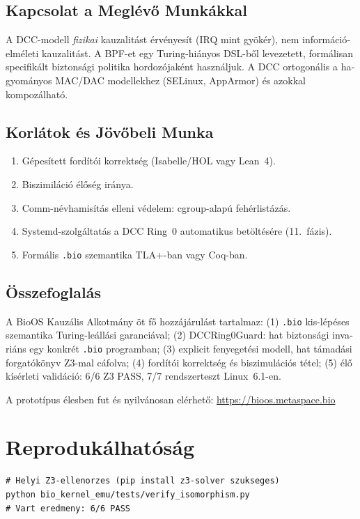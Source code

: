 \documentclass[11pt,a4paper,twoside]{article}
\newcommand{\bioURL}{\url{https://bioos.metaspace.bio}}
\begin{document}
\begin{magyar}
\subsection{Kapcsolat a Meglévő Munkákkal}

A DCC-modell \emph{fizikai} kauzalitást érvényesít (IRQ mint gyökér), nem
információelméleti kauzalitást. A BPF-et egy Turing-hiányos DSL-ből levezetett,
formálisan specifikált biztonsági politika hordozójaként használjuk. A DCC
ortogonális a hagyományos MAC/DAC modellekhez (SELinux, AppArmor) és
azokkal kompozálható.

\subsection{Korlátok és Jövőbeli Munka}

\begin{enumerate}[topsep=2pt,itemsep=2pt]
  \item Gépesített fordítói korrektség (Isabelle/HOL vagy Lean~4).
  \item Biszimiláció élőség iránya.
  \item Comm-névhamisítás elleni védelem: cgroup-alapú fehérlistázás.
  \item Systemd-szolgáltatás a DCC Ring~0 automatikus betöltésére (11.~fázis).
  \item Formális \texttt{.bio} szemantika TLA+-ban vagy Coq-ban.
\end{enumerate}

\subsection{Összefoglalás}

A BioOS Kauzális Alkotmány öt fő hozzájárulást tartalmaz:
(1) \texttt{.bio} kis-lépéses szemantika Turing-leállási garanciával;
(2) DCCRing0Guard: hat biztonsági invariáns egy konkrét \texttt{.bio} programban;
(3) explicit fenyegetési modell, hat támadási forgatókönyv Z3-mal cáfolva;
(4) fordítói korrektség és biszimulációs tétel;
(5) élő kísérleti validáció: 6/6 Z3 PASS, 7/7 rendszerteszt Linux~6.1-en.

A prototípus élesben fut és nyilvánosan elérhető: \bioURL

\appendix

\section{Reprodukálhatóság}

\begin{lstlisting}[style=shellstyle]
# Helyi Z3-ellenorzes (pip install z3-solver szukseges)
python bio_kernel_emu/tests/verify_isomorphism.py
# Vart eredmeny: 6/6 PASS


\end{lstlisting}
\end{magyar}
\end{document}
